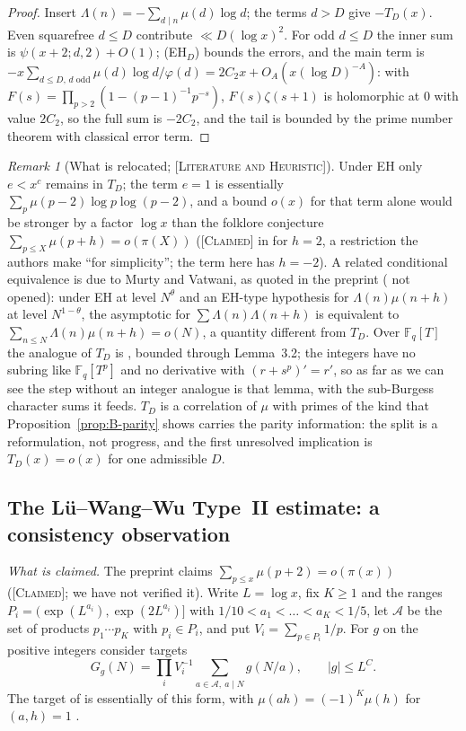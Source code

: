 \documentclass[11pt]{amsart}
\theoremstyle{definition}
\theoremstyle{remark}
\newtheorem{remark}[theorem]{Remark}
\newcommand{\lbl}[1]{\textup{\textsc{[#1]}}}
\begin{document}
\begin{proof}
Insert $\Lambda(n)=-\sum_{d\mid n}\mu(d)\log d$; the terms $d>D$ give $-T_D(x)$.
Even squarefree $d\le D$ contribute $\ll D(\log x)^2$. For odd $d\le D$ the inner
sum is $\psi(x+2;d,2)+O(1)$; (EH$_D$) bounds the errors, and the main term is
$-x\sum_{d\le D,\,d\text{ odd}}\mu(d)\log d/\varphi(d)=2C_2x+O_A(x(\log D)^{-A})$:
with $F(s)=\prod_{p>2}(1-(p-1)^{-1}p^{-s})$, $F(s)\zeta(s+1)$ is holomorphic at $0$
with value $2C_2$, so the full sum is $-2C_2$, and the tail is bounded by the
prime number theorem with classical error term.
\end{proof}

\begin{remark}[What is relocated; \lbl{Literature and Heuristic}]\label{rem:ss-transfer}
Under EH only $e<x^{c}$ remains in $T_D$; the term $e=1$ is essentially
$\sum_p\mu(p-2)\log p\log(p-2)$, and a bound $o(x)$ for that term alone would be
stronger by a factor $\log x$ than the folklore conjecture $\sum_{p\le X}\mu(p+h)=o(\pi(X))$
\cite[p.~1]{Li21} (\lbl{Claimed} in \cite{LWW26} for $h=2$, a restriction the authors make
``for simplicity''; the term here has $h=-2$). A related conditional equivalence is due to Murty and
Vatwani, as quoted in the preprint \cite[Theorem~3, p.~3]{Can26} (\cite{MV17} not opened):
under EH at level $N^{\theta}$ and an EH-type hypothesis for
$\Lambda(n)\mu(n+h)$ at level $N^{1-\theta}$, the asymptotic for
$\sum\Lambda(n)\Lambda(n+h)$ is equivalent to $\sum_{n\le N}\Lambda(n)\mu(n+h)=o(N)$, a
quantity different from $T_D$.
Over $\mathbb F_q[T]$ the analogue of $T_D$ is \cite[(6.22)]{SS19}, bounded
through Lemma~3.2; the integers have no subring like $\mathbb F_q[T^p]$ and no
derivative with $(r+s^p)'=r'$, so as far as we can see the step without an
integer analogue is that lemma, with the sub-Burgess character sums it feeds.
$T_D$ is a correlation of $\mu$ with primes of the kind that
Proposition~\ref{prop:B-parity} shows carries the parity information: the
split is a reformulation, not progress, and the first unresolved implication is
$T_D(x)=o(x)$ for one admissible $D$.
\end{remark}

\subsection{The L\"u--Wang--Wu Type~II estimate: a consistency observation}\label{subsec:lww-transfer}
\emph{What is claimed.} The preprint \cite{LWW26} claims
$\sum_{p\le x}\mu(p+2)=o(\pi(x))$ (\lbl{Claimed}; we have not verified it).
Write $L=\log x$, fix $K\ge1$ and the ranges
$P_i=(\exp(L^{a_i}),\exp(2L^{a_i})]$ with $1/10<a_1<\dots<a_K<1/5$, let
$\mathcal A$ be the set of products $p_1\cdots p_K$ with $p_i\in P_i$, and put
$V_i=\sum_{p\in P_i}1/p$. For $g$ on the positive integers consider targets
\[G_g(N)=\prod_iV_i^{-1}\sum_{a\in\mathcal A,\ a\mid N}g(N/a),\qquad |g|\le L^{C}.\]
The target of \cite{LWW26} is essentially of this form, with
$\mu(ah)=(-1)^K\mu(h)$ for $(a,h)=1$ \cite[p.~15]{LWW26}.
\end{document}
